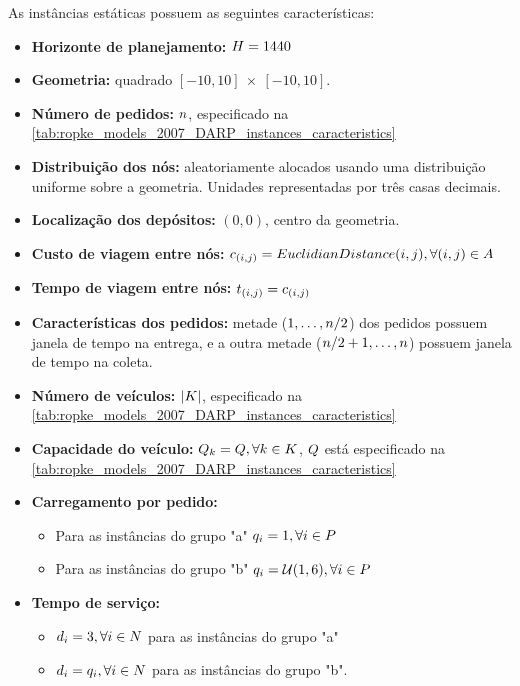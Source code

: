 \documentclass{anpet}
\begin{document}
As instâncias estáticas possuem as seguintes características:
\begin{itemize}
    \item \textbf{Horizonte de planejamento:} $H = 1440$ 
    \item \textbf{Geometria:} quadrado $[-10, 10]\ \times \ [-10, 10]$.
    \item \textbf{Número de pedidos:} $n$, especificado na \autoref{tab:ropke_models_2007_DARP_instances_caracteristics}
    \item \textbf{Distribuição dos nós:} aleatoriamente alocados usando uma distribuição uniforme sobre a geometria. Unidades representadas por três casas decimais.
    \item \textbf{Localização dos depósitos:} $(0, 0)$, centro da geometria.
    \item \textbf{Custo de viagem entre nós:} $c_{(i,j)} = EuclidianDistance(i,j), \forall (i,j) \in A$
    \item \textbf{Tempo de viagem entre nós:} $t_{(i,j)} = c_{(i,j)}$
    \item \textbf{Características dos pedidos:} metade ($1,\ldots,n/2$) dos pedidos possuem janela de tempo na entrega, e a outra metade ($n/2 + 1, \ldots, n$) possuem janela de tempo na coleta.
    \item \textbf{Número de veículos:} $|K|$, especificado na \autoref{tab:ropke_models_2007_DARP_instances_caracteristics}
    \item \textbf{Capacidade do veículo:} $Q_{k}=Q,\forall k \in K$, $Q$ está especificado na \autoref{tab:ropke_models_2007_DARP_instances_caracteristics}
    \item \textbf{Carregamento por pedido:} 
    \begin{itemize}
        \item Para as instâncias do grupo "a" $q_i{} = 1, \forall i{} \in P$
        \item Para as instâncias do grupo "b" $q_i{} = \mathcal{U}(1,6), \forall i{} \in P$
    \end{itemize}
    \item \textbf{Tempo de serviço:} 
    \begin{itemize}
        \item $d_{i{}} = 3, \forall i{} \in N$ para as instâncias do grupo "a" 
        \item $d_{i{}} = q_i{}, \forall i{} \in N$ para as instâncias do grupo "b".

\end{itemize}
\end{itemize}
\end{document}
